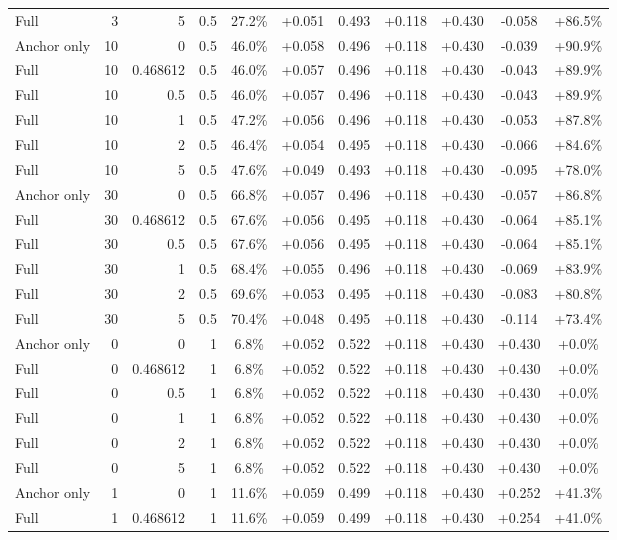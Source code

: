 \begin{table}[htbp]
\begin{tabular}{lrrrccccccc}
Full & 3 & 5 & 0.5 & 27.2\% & +0.051 & 0.493 & +0.118 & +0.430 & -0.058 & +86.5\% \\
Anchor only & 10 & 0 & 0.5 & 46.0\% & +0.058 & 0.496 & +0.118 & +0.430 & -0.039 & +90.9\% \\
Full & 10 & 0.468612 & 0.5 & 46.0\% & +0.057 & 0.496 & +0.118 & +0.430 & -0.043 & +89.9\% \\
Full & 10 & 0.5 & 0.5 & 46.0\% & +0.057 & 0.496 & +0.118 & +0.430 & -0.043 & +89.9\% \\
Full & 10 & 1 & 0.5 & 47.2\% & +0.056 & 0.496 & +0.118 & +0.430 & -0.053 & +87.8\% \\
Full & 10 & 2 & 0.5 & 46.4\% & +0.054 & 0.495 & +0.118 & +0.430 & -0.066 & +84.6\% \\
Full & 10 & 5 & 0.5 & 47.6\% & +0.049 & 0.493 & +0.118 & +0.430 & -0.095 & +78.0\% \\
Anchor only & 30 & 0 & 0.5 & 66.8\% & +0.057 & 0.496 & +0.118 & +0.430 & -0.057 & +86.8\% \\
Full & 30 & 0.468612 & 0.5 & 67.6\% & +0.056 & 0.495 & +0.118 & +0.430 & -0.064 & +85.1\% \\
Full & 30 & 0.5 & 0.5 & 67.6\% & +0.056 & 0.495 & +0.118 & +0.430 & -0.064 & +85.1\% \\
Full & 30 & 1 & 0.5 & 68.4\% & +0.055 & 0.496 & +0.118 & +0.430 & -0.069 & +83.9\% \\
Full & 30 & 2 & 0.5 & 69.6\% & +0.053 & 0.495 & +0.118 & +0.430 & -0.083 & +80.8\% \\
Full & 30 & 5 & 0.5 & 70.4\% & +0.048 & 0.495 & +0.118 & +0.430 & -0.114 & +73.4\% \\
Anchor only & 0 & 0 & 1 & 6.8\% & +0.052 & 0.522 & +0.118 & +0.430 & +0.430 & +0.0\% \\
Full & 0 & 0.468612 & 1 & 6.8\% & +0.052 & 0.522 & +0.118 & +0.430 & +0.430 & +0.0\% \\
Full & 0 & 0.5 & 1 & 6.8\% & +0.052 & 0.522 & +0.118 & +0.430 & +0.430 & +0.0\% \\
Full & 0 & 1 & 1 & 6.8\% & +0.052 & 0.522 & +0.118 & +0.430 & +0.430 & +0.0\% \\
Full & 0 & 2 & 1 & 6.8\% & +0.052 & 0.522 & +0.118 & +0.430 & +0.430 & +0.0\% \\
Full & 0 & 5 & 1 & 6.8\% & +0.052 & 0.522 & +0.118 & +0.430 & +0.430 & +0.0\% \\
Anchor only & 1 & 0 & 1 & 11.6\% & +0.059 & 0.499 & +0.118 & +0.430 & +0.252 & +41.3\% \\
Full & 1 & 0.468612 & 1 & 11.6\% & +0.059 & 0.499 & +0.118 & +0.430 & +0.254 & +41.0\% \\

\end{tabular}
\end{table}

